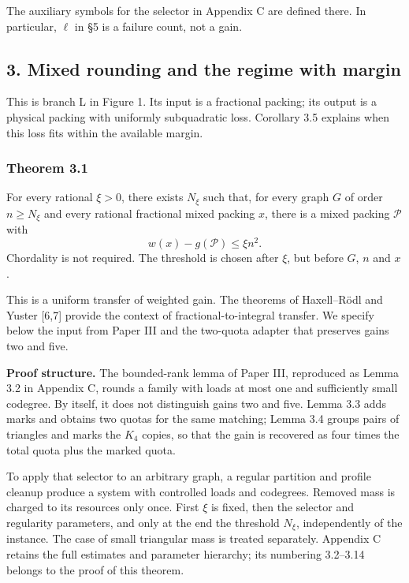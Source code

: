 \documentclass[english,11pt,a4paper]{article}
\begin{document}
The auxiliary symbols for the selector in Appendix C are defined there. In particular, \(\ell\) in §5 is a failure count, not a gain.

\subsection{3. Mixed rounding and the regime with margin}\label{mixed-rounding-and-the-regime-with-margin}

This is branch L in Figure 1. Its input is a fractional packing; its output is a physical packing with uniformly subquadratic loss. Corollary 3.5 explains when this loss fits within the available margin.

\subsubsection{Theorem 3.1}\label{theorem-3.1}

For every rational \(\xi>0\), there exists \(N_\xi\) such that, for every graph \(G\) of order \(n\ge N_\xi\) and every rational fractional mixed packing \(x\), there is a mixed packing \(\mathcal P\) with \[
w(x)-g(\mathcal P)\le\xi n^2.
\tag{3.1}
\] Chordality is not required. The threshold is chosen after \(\xi\), but before \(G\), \(n\) and \(x\).

This is a uniform transfer of weighted gain. The theorems of Haxell--Rödl and Yuster {[}6,7{]} provide the context of fractional-to-integral transfer. We specify below the input from Paper III and the two-quota adapter that preserves gains two and five.

\textbf{Proof structure.} The bounded-rank lemma of Paper III, reproduced as Lemma 3.2 in Appendix C, rounds a family with loads at most one and sufficiently small codegree. By itself, it does not distinguish gains two and five. Lemma 3.3 adds marks and obtains two quotas for the same matching; Lemma 3.4 groups pairs of triangles and marks the \(K_4\) copies, so that the gain is recovered as four times the total quota plus the marked quota.

To apply that selector to an arbitrary graph, a regular partition and profile cleanup produce a system with controlled loads and codegrees. Removed mass is charged to its resources only once. First \(\xi\) is fixed, then the selector and regularity parameters, and only at the end the threshold \(N_\xi\), independently of the instance. The case of small triangular mass is treated separately. Appendix C retains the full estimates and parameter hierarchy; its numbering 3.2--3.14 belongs to the proof of this theorem.
\end{document}
